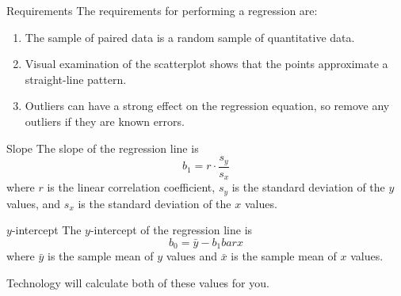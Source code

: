 \documentclass{beamer}
\begin{document}
\begin{frame}
\begin{block}{Requirements}
The requirements for performing a regression are:
\begin{enumerate}
\item The sample of paired data is a random sample of quantitative data.\pause
\item Visual examination of the scatterplot shows that the points approximate a straight-line pattern.\pause
\item Outliers can have a strong effect on the regression equation, so remove any outliers if they are known errors.
\end{enumerate}
\end{block}
\end{frame}

\begin{frame}
\begin{block}{Slope}
The slope of the regression line is
\begin{equation*}
b_1=r\cdot\dfrac{s_y}{s_x}
\end{equation*}
where $r$ is the linear correlation coefficient, $s_y$ is the standard deviation of the $y$ values, and $s_x$ is the standard deviation of the $x$ values.
\end{block}\pause

\begin{block}{$y$-intercept}
The $y$-intercept of the regression line is
\begin{equation*}
b_0=\bar{y}-b_1bar{x}
\end{equation*}
where $\bar{y}$ is the sample mean of $y$ values and $\bar{x}$ is the sample mean of $x$ values.
\end{block}\pause

\begin{note}
Technology will calculate both of these values for you.
\end{note}
\end{frame}
\end{document}
